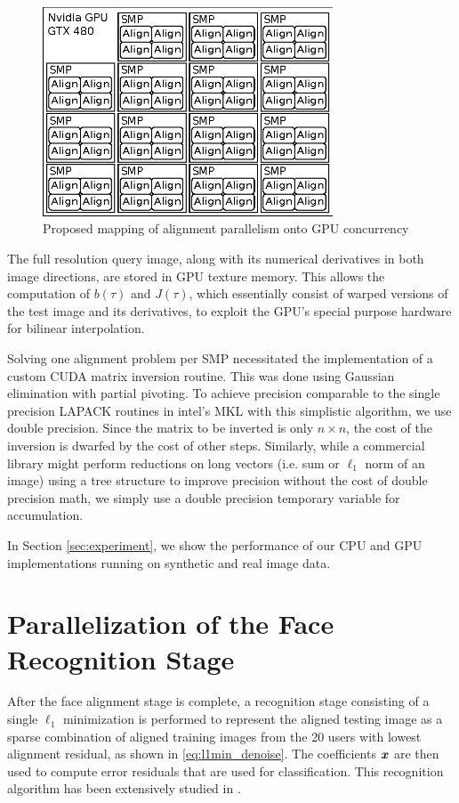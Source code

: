 \documentclass[10pt,twocolumn,letterpaper]{article}
\begin{document}
\begin{figure}
\centering
\includegraphics[width=3.4in]{figures/alignment_mapping_gpu}
\caption{Proposed mapping of alignment parallelism onto GPU concurrency}
\label{fig:alignment_mapping_gpu}
\end{figure}

The full resolution query image, along with its numerical derivatives in both
image directions, are stored in GPU texture memory. This  allows the
computation of $b(\tau)$ and $J(\tau)$, which essentially consist of warped
versions of the test image and its derivatives, to exploit the GPU's special
purpose hardware for bilinear interpolation.

Solving one alignment problem per SMP necessitated the implementation of a
custom CUDA matrix inversion routine.  This was done using Gaussian elimination
with partial pivoting.  To achieve precision comparable to the single precision
LAPACK routines in intel's MKL with this simplistic algorithm, we use double
precision.  Since the matrix to be inverted is only $n \times n$, the cost of
the inversion is dwarfed by the cost of other steps.  Similarly, while a
commercial library might perform reductions on long vectors (i.e. sum or
$\ell_1$ norm of an image) using a tree structure to improve precision without
the cost of double precision math, we simply use a double precision temporary
variable for accumulation.

In Section \ref{sec:experiment}, we show the performance of our CPU and GPU
implementations running on synthetic and real image data.

\section{Parallelization of the Face Recognition Stage}
\label{sec:recognition}
After the face alignment stage is complete, a recognition stage consisting of a
single $\ell_1$ minimization is performed to represent the aligned testing
image as a sparse combination of aligned training images from the 20 users with lowest alignment
residual, as shown in \eqref{eq:l1min_denoise}. 
The coefficients ${\boldsymbol{x}}$ are then used to compute error residuals that are
used for classification.  This recognition algorithm has been extensively studied in 
\cite{WrightJ2009-PAMI,YangA2010-ICIP,WagnerA2011-PAMI}.
\end{document}
